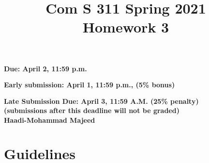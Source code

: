 \documentclass[11pt]{amsart}
\begin{document}


\title{
Com S 311 Spring 2021\\
Homework 3
}

\maketitle


\vspace{-.8cm}
\begin{center}
{\bf Due:  April 2, 11:59 p.m.}

\smallskip
\textbf{Early submission: April 1, 11:59 p.m., (5\% bonus)}

\smallskip
{\bf Late Submission Due: April 3, 11:59 \textbf{A.M.} (25\% penalty)\\
(submissions after this deadline will not be graded)}
\textbf{\\Haadi-Mohammad Majeed}
\end{center}

\medskip

\section*{\large Guidelines}
\end{document}
